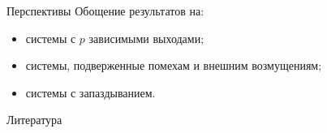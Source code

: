 \documentclass[notheorems,aspectratio=169]{beamer}
\theoremstyle{definition}
\begin{document}
\begin{frame}{Перспективы}
  Обощение результатов на:
  \begin{itemize}
    \item системы с $p$ зависимыми выходами;
    \item системы, подверженные помехам и внешним возмущениям;
    \item системы с запаздыванием.
  \end{itemize}
\end{frame}

\begin{frame}{Литература}
  \nocite{Andreev1976}
  \nocite{Kalman2004}
  \nocite{Polyak2019}
  \nocite{Smirnov2022}

  \printbibliography{}
\end{frame}
\end{document}
